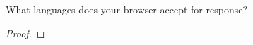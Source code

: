 \documentclass[../../main.tex]{subfiles}
\begin{document}
\begin{wts}
What languages does your browser accept for response?
\end{wts}
\begin{proof}

\end{proof}
\end{document}
